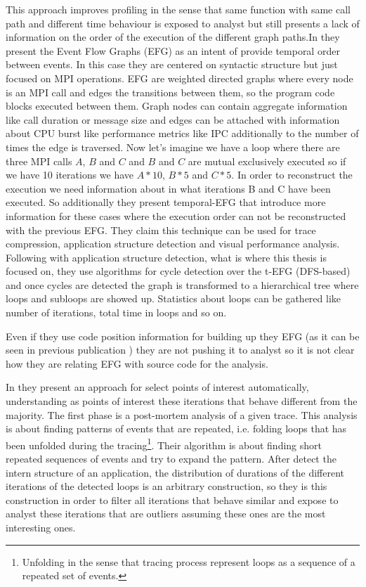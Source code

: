 This approach improves profiling in the sense that same function with same call
path and different time behaviour is exposed to analyst but still presents a lack 
of information on the order of the execution of the different graph paths.In
\cite{aguilar2016event} they present the Event Flow Graphs (EFG) as an intent of
provide temporal order between events. In this case they are centered on
syntactic structure but just focused on MPI operations. EFG are
weighted directed graphs where every node is an MPI call and edges the
transitions between them, so the program code blocks executed between them.
Graph nodes can contain aggregate information like call duration or message size
and edges can be attached with information about CPU burst like performance
metrics like IPC additionally to the number of times the edge is traversed.
Now let's imagine we have a loop where there are three MPI calls $A$, $B$ and
$C$ and $B$ and $C$ are mutual exclusively executed so if we have 10 
iterations we have $A*10$, $B*5$ and $C*5$. In order to reconstruct the execution
we need information about in what iterations B and C have been executed.
So additionally they present temporal-EFG that introduce more
information for these cases where the execution order can not be reconstructed
with the previous EFG. They claim this technique can be used for trace
compression, application structure detection and visual performance analysis.
Following with application structure detection, what is where this thesis is
focused on, they use algorithms for cycle detection over the t-EFG (DFS-based)
and once cycles are detected the graph is transformed to a hierarchical tree
where loops and subloops are showed up. Statistics about loops can be gathered
like number of iterations, total time in loops and so on.

Even if they use code position information for building up they EFG (as it can
be seen in previous publication \cite{aguilar2014mpi}) they are not pushing it
to analyst so it is not clear how they are relating EFG with source code for the
analysis.

In \cite{trahay2015selecting} they present an approach for select points of
interest automatically, understanding as points of interest these iterations that
behave different from the majority. The first phase is a post-mortem analysis of
a given trace. This analysis is about finding patterns of events that are
repeated, i.e. folding loops that has been unfolded during the
tracing\footnote{Unfolding in the sense that tracing process represent loops as
a sequence of a repeated set of events.}. Their algorithm is about finding short
repeated sequences of events and try to expand the pattern. After detect the
intern structure of an application, the distribution of durations of the
different iterations of the detected loops is an arbitrary construction, so they
is this construction in order to filter all iterations that behave similar and
expose to analyst these iterations that are outliers assuming these ones are the
most interesting ones.

